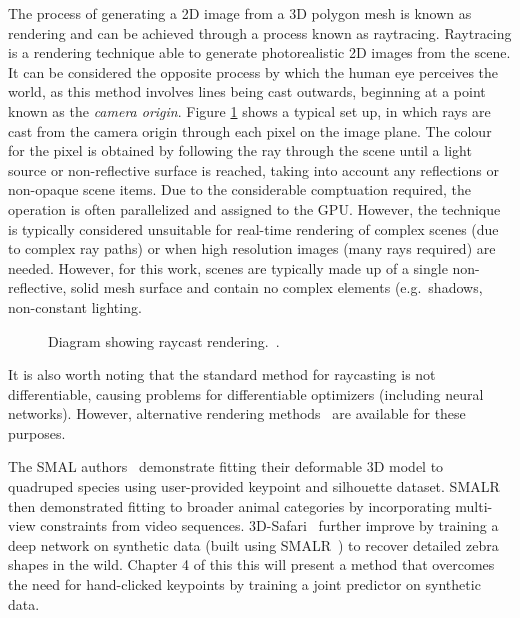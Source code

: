     \begin{definition}
        The process of generating a 2D image from a 3D polygon mesh is known as rendering and can be achieved through a process known as raytracing. Raytracing is a rendering technique able to generate photorealistic 2D images from the scene. It can be considered the opposite process by which the human eye perceives the world, as this method involves lines being cast outwards, beginning at a point known as the \emph{camera origin}. Figure \ref{fig:raycasting} shows a typical set up, in which rays are cast from the camera origin through each pixel on the image plane. The colour for the pixel is obtained by following the ray through the scene until a light source or non-reflective surface is reached, taking into account any reflections or non-opaque scene items. Due to the considerable comptuation required, the operation is often parallelized and assigned to the GPU. However, the technique is typically considered unsuitable for real-time rendering of complex scenes (due to complex ray paths) or when high resolution images (many rays required) are needed. However, for this work, scenes are typically made up of a single non-reflective, solid mesh surface and contain no complex elements (e.g.\ shadows, non-constant lighting.

        \begin{figure}[H] %
            \caption{Diagram showing raycast rendering.~\cite{rendering}.}
            \label{fig:raycasting}
        \end{figure}

        It is also worth noting that the standard method for raycasting is not differentiable, causing problems for differentiable optimizers (including neural networks). However, alternative rendering methods~\cite{loper2014opendr} are available for these purposes.
    \end{definition}

    The SMAL authors~\cite{zuffi2017menagerie} demonstrate fitting their deformable 3D model to quadruped species using user-provided keypoint and silhouette dataset. SMALR~\cite{zuffi_lions} then demonstrated fitting to broader animal categories by incorporating multi-view constraints from video sequences. 3D-Safari~\cite{Zuffi19Safari} further improve by training a deep network on synthetic data (built using SMALR~\cite{zuffi_lions}) to recover detailed zebra shapes in the wild. Chapter 4 of this this will present a method that overcomes the need for hand-clicked keypoints by training a joint predictor on synthetic data. 

